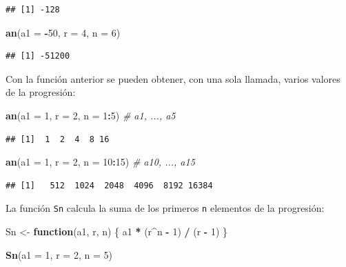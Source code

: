 \documentclass[]{book}
\newenvironment{Shaded}{\begin{snugshade}}{\end{snugshade}}
\newcommand{\KeywordTok}[1]{\textcolor[rgb]{0.13,0.29,0.53}{\textbf{#1}}}
\newcommand{\DataTypeTok}[1]{\textcolor[rgb]{0.13,0.29,0.53}{#1}}
\newcommand{\DecValTok}[1]{\textcolor[rgb]{0.00,0.00,0.81}{#1}}
\newcommand{\StringTok}[1]{\textcolor[rgb]{0.31,0.60,0.02}{#1}}
\newcommand{\CommentTok}[1]{\textcolor[rgb]{0.56,0.35,0.01}{\textit{#1}}}
\newcommand{\ControlFlowTok}[1]{\textcolor[rgb]{0.13,0.29,0.53}{\textbf{#1}}}
\newcommand{\OperatorTok}[1]{\textcolor[rgb]{0.81,0.36,0.00}{\textbf{#1}}}
\newcommand{\NormalTok}[1]{#1}
\begin{document}
\begin{verbatim}
## [1] -128
\end{verbatim}

\begin{Shaded}
\begin{Highlighting}[]
\KeywordTok{an}\NormalTok{(}\DataTypeTok{a1 =} \OperatorTok{-}\DecValTok{50}\NormalTok{, }\DataTypeTok{r =} \DecValTok{4}\NormalTok{, }\DataTypeTok{n =} \DecValTok{6}\NormalTok{)}
\end{Highlighting}
\end{Shaded}

\begin{verbatim}
## [1] -51200
\end{verbatim}

Con la función anterior se pueden obtener, con una sola llamada, varios
valores de la progresión:

\begin{Shaded}
\begin{Highlighting}[]
\KeywordTok{an}\NormalTok{(}\DataTypeTok{a1 =} \DecValTok{1}\NormalTok{, }\DataTypeTok{r =} \DecValTok{2}\NormalTok{, }\DataTypeTok{n =} \DecValTok{1}\OperatorTok{:}\DecValTok{5}\NormalTok{)    }\CommentTok{# a1, ..., a5}
\end{Highlighting}
\end{Shaded}

\begin{verbatim}
## [1]  1  2  4  8 16
\end{verbatim}

\begin{Shaded}
\begin{Highlighting}[]
\KeywordTok{an}\NormalTok{(}\DataTypeTok{a1 =} \DecValTok{1}\NormalTok{, }\DataTypeTok{r =} \DecValTok{2}\NormalTok{, }\DataTypeTok{n =} \DecValTok{10}\OperatorTok{:}\DecValTok{15}\NormalTok{)  }\CommentTok{# a10, ..., a15}
\end{Highlighting}
\end{Shaded}

\begin{verbatim}
## [1]   512  1024  2048  4096  8192 16384
\end{verbatim}

La función \texttt{Sn} calcula la suma de los primeros \texttt{n}
elementos de la progresión:

\begin{Shaded}
\begin{Highlighting}[]
\NormalTok{Sn <-}\StringTok{ }\ControlFlowTok{function}\NormalTok{(a1, r, n) \{}
\NormalTok{        a1 }\OperatorTok{*}\StringTok{ }\NormalTok{(r}\OperatorTok{^}\NormalTok{n }\OperatorTok{-}\StringTok{ }\DecValTok{1}\NormalTok{) }\OperatorTok{/}\StringTok{ }\NormalTok{(r }\OperatorTok{-}\StringTok{ }\DecValTok{1}\NormalTok{)}
\NormalTok{      \}}
  
\KeywordTok{Sn}\NormalTok{(}\DataTypeTok{a1 =} \DecValTok{1}\NormalTok{, }\DataTypeTok{r =} \DecValTok{2}\NormalTok{, }\DataTypeTok{n =} \DecValTok{5}\NormalTok{)}
\end{Highlighting}
\end{Shaded}
\end{document}

